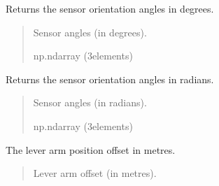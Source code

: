 \documentclass[letterpaper,10pt,english]{sphinxmanual}
\begin{document}
\begin{fulllineitems}
\begin{fulllineitems}
\label{\detokenize{modules/measurement/platform:qnav.measurement.platform.SensorAxis.sensor_angles_deg}}
\pysigstartsignatures
{}
\pysigstopsignatures
\sphinxAtStartPar
Returns the sensor orientation angles in degrees.
\begin{quote}\begin{description}
\sphinxAtStartPar
Sensor angles (in degrees).

\sphinxAtStartPar
np.ndarray (3\sphinxhyphen{}elements)

\end{description}\end{quote}

\end{fulllineitems}


\begin{fulllineitems}
\label{\detokenize{modules/measurement/platform:qnav.measurement.platform.SensorAxis.sensor_angles_rad}}
\pysigstartsignatures
{}
\pysigstopsignatures
\sphinxAtStartPar
Returns the sensor orientation angles in radians.
\begin{quote}\begin{description}
\sphinxAtStartPar
Sensor angles (in radians).

\sphinxAtStartPar
np.ndarray (3\sphinxhyphen{}elements)

\end{description}\end{quote}

\end{fulllineitems}


\begin{fulllineitems}
\label{\detokenize{modules/measurement/platform:qnav.measurement.platform.SensorAxis.lever_arm}}
\pysigstartsignatures
{}
\pysigstopsignatures
\sphinxAtStartPar
The lever arm position offset in metres.
\begin{quote}\begin{description}
\sphinxAtStartPar
Lever arm offset (in metres).


\end{description}
\end{quote}
\end{fulllineitems}
\end{fulllineitems}
\end{document}

